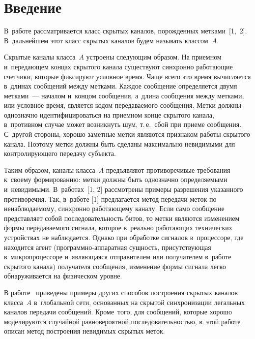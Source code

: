 \begin{multicols}{2}

\label{st\stat}

\section{Введение}

   В~работе рассматривается класс скрытых каналов, порожденных метками~[1,~2].
   В~дальнейшем этот класс скрытых каналов будем называть классом~$A$.

  Скрытые каналы класса~$A$ устроены сле\-ду\-ющим образом. На приемном
и~передающем концах скрытого канала существуют синхронно ра\-бо\-та\-ющие
счетчики, которые фиксируют условное время. Чаще всего это время
вычисляется в~длинах сообщений между метками. Каждое сообщение
определяется двумя метками~--- началом и~концом сообщения, а~длина
сообщения между метками, или условное время, является кодом передаваемого
сообщения. Метки должны однозначно идентифицироваться на приемном конце
скрытого канала, в~противном случае может возникнуть шум, т.\,е.\ сбой при
приеме сообщения. С~другой стороны, хорошо заметные метки являются
признаком работы скрытого канала. Поэтому метки должны быть сделаны
максимально невидимыми для контролирующего передачу субъекта.

  Таким образом, каналы класса~$A$ предъявляют противоречивые требования
к~своему формированию: метки должны быть однозначно опре\-де\-ля\-емы\-ми
и~невидимыми. В~работах~[1, 2] рассмотрены примеры разрешения
указанного противоречия. Так, в~работе [1] предлагается метод передачи меток
по ненаблюдаемому, синхронно работающему каналу. Если само сообщение
представляет собой последовательность битов, то метки являются изменением
формы передаваемого сигнала, которое в~реально работающих технических
устройствах не наблюдается. Однако при обработке сигналов в~процессоре, где
находится агент (про\-грам\-мно-ап\-па\-рат\-ная сущность, присутствующая
в~микропроцессоре и~являющаяся отправителем или получателем в~работе
скрытого канала) получателя сообщения, изменение формы сигнала легко
обнаруживается на физическом уровне.

  В работе~\cite{2-gr} приведены примеры других способов построения
скрытых каналов класса~$A$ в~глобальной сети, основанных на скрытой
синхронизации легальных каналов передачи сообщений. \mbox{Кроме}~того, для
сообщений, которые хорошо моделируются случайной равновероятной
последовательностью, в~этой работе описан метод построения невидимых
скрытых меток.


\end{multicols}
